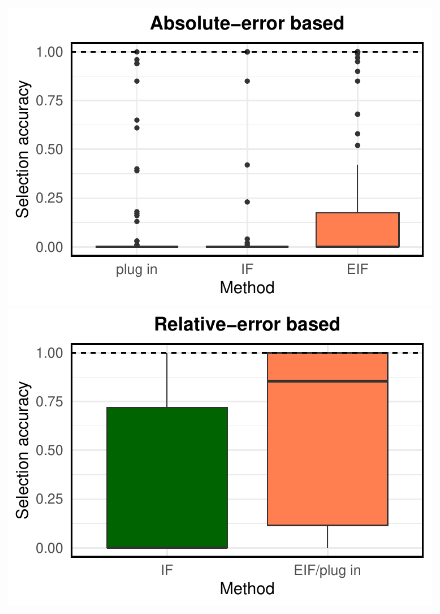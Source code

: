 \documentclass[twoside]{article}
\newcommand{\1}{{\mathbbm{1}}}
\begin{document}
\begin{figure}[ht]
\begin{minipage}{0.23\textwidth}
                \includegraphics[clip, trim = 0cm 0cm 0cm 0cm, width = \textwidth]{plot/ACIC_nonlinear_propensity_linear_HTE_selection_accuracy_absolute_error.pdf}
        \end{minipage}
            \begin{minipage}{0.23\textwidth}
                \centering
                \includegraphics[clip, trim = 0cm 0cm 0cm 0cm, width = \textwidth]{plot/ACIC_nonlinear_propensity_linear_HTE_selection_accuracy_relative_error.pdf}
        \end{minipage}
         \\
                \begin{minipage}{0.23\textwidth}
                \centering

\end{minipage}
\end{figure}
\end{document}
